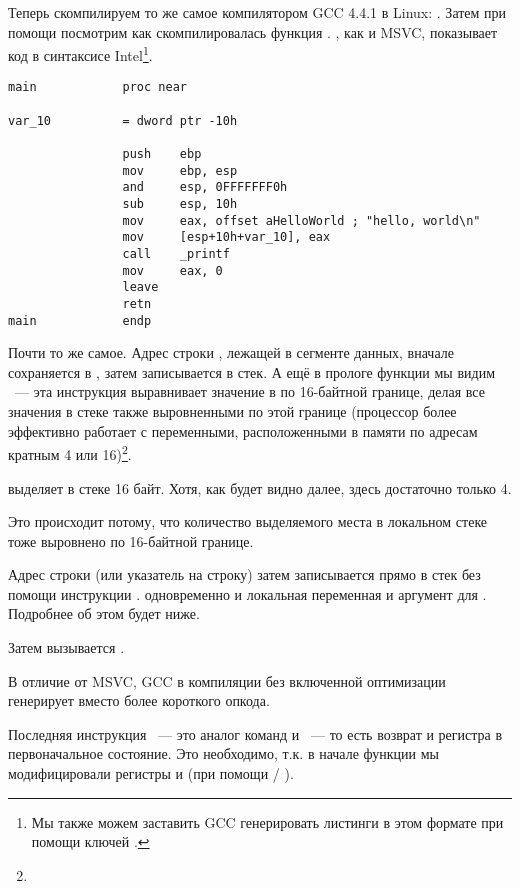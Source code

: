 
Теперь скомпилируем то же самое компилятором GCC 4.4.1 в Linux: .
Затем при помощи \IDA посмотрим как скомпилировалась функция \main.
\IDA, как и MSVC, показывает код в синтаксисе Intel\footnote{Мы также можем заставить GCC генерировать листинги в этом формате при помощи ключей .}.

\begin{lstlisting}[caption=код в \IDA]
main            proc near

var_10          = dword ptr -10h

                push    ebp
                mov     ebp, esp
                and     esp, 0FFFFFFF0h
                sub     esp, 10h
                mov     eax, offset aHelloWorld ; "hello, world\n"
                mov     [esp+10h+var_10], eax
                call    _printf
                mov     eax, 0
                leave
                retn
main            endp
\end{lstlisting}

Почти то же самое. 
Адрес строки , лежащей в сегменте данных, вначале сохраняется в \EAX, затем записывается в стек.
А ещё в прологе функции мы видим ~--- 
эта инструкция выравнивает значение в \ESP по 16-байтной границе, делая все значения 
в стеке также выровненными по этой границе (процессор более эффективно работает с переменными, расположенными
в памяти по адресам кратным 4 или 16)\footnote{\URLWPDA}.

 выделяет в стеке 16 байт. Хотя, как будет видно далее, здесь достаточно только 4.

Это происходит потому, что количество выделяемого места в локальном стеке тоже выровнено по 16-байтной границе.

Адрес строки (или указатель на строку) затем записывается прямо в стек без помощи инструкции \PUSH.
 одновременно и локальная переменная и аргумент для \printf{}. Подробнее об этом будет ниже.

Затем вызывается \printf.

В отличие от MSVC, GCC в компиляции без включенной оптимизации генерирует  вместо более короткого опкода.

Последняя инструкция \LEAVE~--- это аналог команд  и ~--- то есть возврат  и регистра \EBP в первоначальное состояние.
Это необходимо, т.к. в начале функции мы модифицировали регистры \ESP и \EBP (при помощи  / ).

